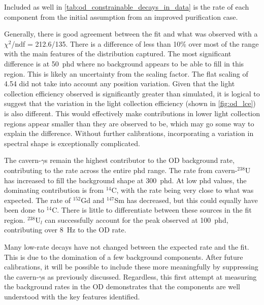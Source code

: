 Included as well in \autoref{tab:od_constrainable_decays_in_data} is the rate of each component from the initial assumption from an improved purification case.
\par
Generally, there is good agreement between the fit and what was observed with a $\chi^2$/ndf = 212.6/135.
There is a difference of less than 10\% over most of the range with the main features of the distribution captured.
The most significant difference is at 50~phd where no background appears to be able to fill in this region.
This is likely an uncertainty from the scaling factor.
The flat scaling of 4.54 did not take into account any position variation.
Given that the light collection efficiency observed is significantly greater than simulated, it is logical to suggest that the variation in the light collection efficiency (shown in \autoref{fig:od_lce}) is also different.
This would effectively make contributions in lower light collection regions appear smaller than they are observed to be, which may go some way to explain the difference.
Without further calibrations, incorporating a variation in spectral shape is exceptionally complicated.
\par
The cavern-$\gamma$s remain the highest contributor to the OD background rate, contributing to the rate across the entire phd range.
The rate from cavern-${}^{238}$U has increased to fill the background shape at 300~phd.
At low phd values, the dominating contribution is from ${}^{14}$C, with the rate being very close to what was expected.
The rate of ${}^{152}$Gd and ${}^{147}$Sm has decreased, but this could equally have been done to ${}^{14}$C.
There is little to differentiate between these sources in the fit region.
${}^{238}$U$_l$ can successfully account for the peak observed at 100~phd, contributing over 8~Hz to the OD rate.
\par
Many low-rate decays have not changed between the expected rate and the fit.
This is due to the domination of a few background components.
After future calibrations, it will be possible to include these more meaningfully by suppressing the cavern-$\gamma$s as previously discussed.
Regardless, this first attempt at measuring the background rates in the OD demonstrates that the components are well understood with the key features identified.




